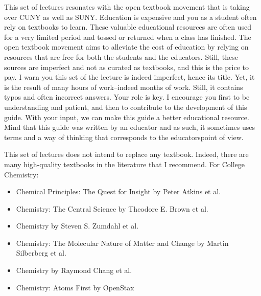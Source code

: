 \documentclass[main.tex]{subfiles}
\begin{document}
\begin{fullwidth}
\begin{multicols*}{2}
This set of lectures resonates with the open textbook movement that is taking over CUNY as well as SUNY. Education is expensive and you as a student often rely on textbooks to learn. These valuable educational resources are often used for a very limited period and tossed or returned when a class has finished. The open textbook movement aims to alleviate the cost of education by relying on resources that are free for both the students and the educators. Still, these sources are imperfect and not as curated as textbooks, and this is the price to pay. I warn you this set of the lecture is indeed imperfect, hence its title. Yet, it is the result of many hours of work--indeed months of work. Still, it contains typos and often incorrect answers. Your role is key. I encourage you first to be understanding and patient, and then to contribute to the development of this guide. With your input, we can make this guide a better educational resource. Mind that this guide was written by an educator and as such, it sometimes uses terms and a way of thinking that corresponds to the educators\textquotesingle point of view.

This set of lectures does not intend to replace any textbook. Indeed, there are many high-quality textbooks in the literature that I recommend. For College Chemistry:
\begin{small}\begin{itemize}[label=]
\setlength\itemsep{0.5em}
\item Chemical Principles: The Quest for Insight by Peter Atkins et al.
\item Chemistry: The Central Science by Theodore E. Brown et al.
\item Chemistry by Steven S. Zumdahl et al.
\item Chemistry: The Molecular Nature of Matter and Change by Martin Silberberg et al.
\item Chemistry by Raymond Chang et al.
\item Chemistry: Atoms First by OpenStax
\end{itemize}\end{small}


\end{multicols*}
\end{fullwidth}
\end{document}

